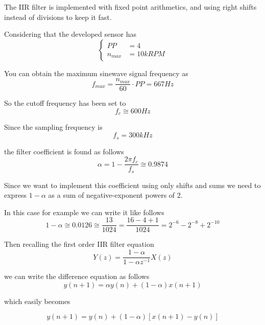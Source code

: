 \documentclass[main]{subfiles}
\begin{document}
The \ac{IIR} filter is implemented with fixed point arithmetics, and using right 
shifts instead of divisions to keep it fast.

Considering that the developed sensor has
\begin{equation}
    \begin{cases}
        PP &= 4\\
        n_{max} &= 10 kRPM
    \end{cases}
\end{equation}

You can obtain the maximum sinewave signal frequency as 
\begin{equation}
    f_{max} = \frac{n_{max}}{60} \cdot PP = 667 Hz
\end{equation}

So the cutoff frequency has been set to 
\begin{equation}
    f_c \cong 600 Hz
\end{equation}

Since the sampling frequency is 
\begin{equation}
    f_s = 300 kHz
\end{equation}

the filter coefficient is found as follows
\begin{equation}
    \alpha = 1 - \frac{2\pi f_c}{f_s} \cong 0.9874
\end{equation}

Since we want to implement this coefficient using only shifts and sums we need 
to express $1-\alpha$ as a sum of negative-exponent powers of 2.

In this case for example we can write it like follows
\begin{equation}
    1 - \alpha \cong 0.0126 \cong \frac{13}{1024} = \frac{16-4+1}{1024} = 2^{-6} - 2^{-8} + 2^{-10}
    \label{EQ_ALPHA_DECOMP}
\end{equation}

Then recalling the first order \ac{IIR} filter equation
\begin{equation}
    Y(z) = \frac{1-\alpha}{1-\alpha z^{-1}}X(z)
\end{equation}

we can write the difference equation as follows
\begin{equation}
    y(n+1) = \alpha y(n) + (1-\alpha) x(n+1)
\end{equation}

which easily becomes

\begin{equation}
    y(n+1) = y(n) + (1-\alpha) \left[x(n+1)-y(n)\right]
\end{equation}
\end{document}
